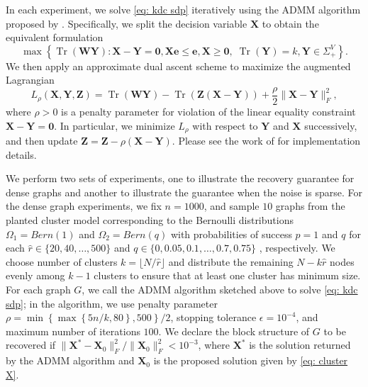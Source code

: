 \documentclass[twoside,11pt]{article}
\newcommand{\Z}{\bs{Z}}
\DeclareMathOperator{\tr}{{Tr}}
\newcommand{\e}{\bs {e}}
\newcommand{\bs}{\boldsymbol}
\newcommand{\X}{\bs {X}}
\newcommand{\Y}{\bs {Y}}
\newcommand{\W}{\bs {W}}
\newcommand{\0}{\bs{0}}
\newcommand{\bra}[1]{\ensuremath{\left\{ #1 \right\}}} %
\newcommand{\eq}[1]{\(#1\)}
\begin{document}
{%
In each experiment, we solve \eqref{eq: kdc sdp} iteratively using the ADMM algorithm proposed by \cite{ames2014guaranteed}.
Specifically, we split the decision variable \eq{\X} to obtain the equivalent formulation
\begin{equation} \label{eq: kdc admm}
\max \bra{ \tr(\W\Y) : \X - \Y = \0, \X\e \le \e, \X \ge \0, \; \tr(\Y) = k, \Y \in \Sigma^V_+ }.
\end{equation}
We then apply an approximate dual ascent scheme to maximize the augmented Lagrangian
\[
L_\rho(\X,\Y,\Z) = \tr(\W\Y) - \tr(\Z(\X-\Y) ) + \frac{\rho}{2} \| \X - \Y\|^2_F,
\]
where \(\rho > 0\) is a penalty parameter for violation of the linear equality constraint  \(\X-\Y = \0\).
In particular, we minimize \(L_\rho\) with respect to \(\Y\) and \(\X\) successively, and then update
\(\Z = \Z - \rho(\X-\Y)\). Please see the work of \citet[Section 6]{ames2014guaranteed} for implementation details.

We perform two sets of experiments, one to illustrate the recovery guarantee for dense graphs and another to illustrate the guarantee 
when the noise is sparse.
For the dense graph experiments, we fix \(n = 1000\), and sample \(10\) graphs 
from the planted cluster model corresponding to the Bernoulli
distributions \(\Omega_1 = Bern(1)\) and \(\Omega_2 = Bern(q) \) with probabilities of success \(p = 1\) and \(q\) for each 
\(\hat r \in \{20, 40, \dots, 500\}\)
and \(q \in \{0,0.05, 0.1, \dots, 0.7, 0.75\}\) , respectively.
We choose number of clusters $k=\lfloor N/\hat r \rfloor$
and distribute the remaining $N - k\hat r$ nodes
evenly among $k-1$ clusters to ensure that at least one cluster
has minimum size.
For each graph \(G\), we call the ADMM algorithm sketched above to solve \eqref{eq: kdc sdp};
in the algorithm, we use penalty parameter \(\rho = \min \bra{ \max \bra{ 5n/k, 80}, 500}/2 \),
stopping tolerance \(\epsilon = 10^{-4}\), and maximum number of iterations \(100\).
We declare the block structure of \(G\) to be recovered if \(\|\X^* - \X_0\|^2_F / \|\X_0\|^2_F < 10^{-3} \),
where \(\X^* \) is the solution returned by the ADMM algorithm and \(\X_0\) is the proposed solution
given by \eqref{eq: cluster X}.

}
\end{document}
